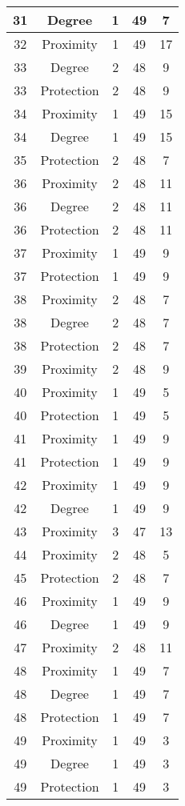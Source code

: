 \documentclass[results.tex]{subfiles}
\begin{document}
\begin{center}
\begin{tabular}{| c || c | c | c | c |}
    \hline
    31 & Degree & 1 & 49 & 7 \\ 
    \hline
    32 & Proximity & 1 & 49 & 17 \\ 
    \hline
    33 & Degree & 2 & 48 & 9 \\ 
    \hline
    33 & Protection & 2 & 48 & 9 \\ 
    \hline
    34 & Proximity & 1 & 49 & 15 \\ 
    \hline
    34 & Degree & 1 & 49 & 15 \\ 
    \hline
    35 & Protection & 2 & 48 & 7 \\ 
    \hline
    36 & Proximity & 2 & 48 & 11 \\ 
    \hline
    36 & Degree & 2 & 48 & 11 \\ 
    \hline
    36 & Protection & 2 & 48 & 11 \\ 
    \hline
    37 & Proximity & 1 & 49 & 9 \\ 
    \hline
    37 & Protection & 1 & 49 & 9 \\ 
    \hline
    38 & Proximity & 2 & 48 & 7 \\ 
    \hline
    38 & Degree & 2 & 48 & 7 \\ 
    \hline
    38 & Protection & 2 & 48 & 7 \\ 
    \hline
    39 & Proximity & 2 & 48 & 9 \\ 
    \hline
    40 & Proximity & 1 & 49 & 5 \\ 
    \hline
    40 & Protection & 1 & 49 & 5 \\ 
    \hline
    41 & Proximity & 1 & 49 & 9 \\ 
    \hline
    41 & Protection & 1 & 49 & 9 \\ 
    \hline
    42 & Proximity & 1 & 49 & 9 \\ 
    \hline
    42 & Degree & 1 & 49 & 9 \\ 
    \hline
    43 & Proximity & 3 & 47 & 13 \\ 
    \hline
    44 & Proximity & 2 & 48 & 5 \\ 
    \hline
    45 & Protection & 2 & 48 & 7 \\ 
    \hline
    46 & Proximity & 1 & 49 & 9 \\ 
    \hline
    46 & Degree & 1 & 49 & 9 \\ 
    \hline
    47 & Proximity & 2 & 48 & 11 \\ 
    \hline
    48 & Proximity & 1 & 49 & 7 \\ 
    \hline
    48 & Degree & 1 & 49 & 7 \\ 
    \hline
    48 & Protection & 1 & 49 & 7 \\ 
    \hline
    49 & Proximity & 1 & 49 & 3 \\ 
    \hline
    49 & Degree & 1 & 49 & 3 \\ 
    \hline
    49 & Protection & 1 & 49 & 3 \\ 
    \hline   \end{tabular}
\end{center}
\end{document}
